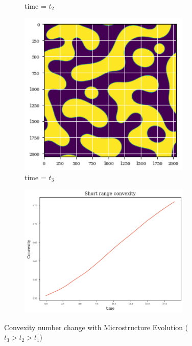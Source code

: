 \documentclass[12pt, a4paper]{report}
\begin{document}
\begin{figure}[H]
\begin{subfigure}{.32\textwidth}
  \label{img:microstrImg}
  \caption{time = $t_2$}
\end{subfigure}
\begin{subfigure}{.32\textwidth}
  \centering
  \includegraphics[width=0.9\textwidth]{Pictures/MSFeatures/ConvexMicroEvalEnd.png}
  \caption{time = $t_3$}
  \label{img:microstrImg}
\end{subfigure}
\begin{subfigure}{.5\textwidth}
  \centering
  \includegraphics[width=0.9\textwidth]{Pictures/MSFeatures/ShortRangeConvexityIso.png}
  \label{img:microstrImg}
\end{subfigure}
\caption{Convexity number change with Microstructure Evolution ($t_3>t_2>t_1$)}
\label{fig:test}
\end{figure}
\end{document}
